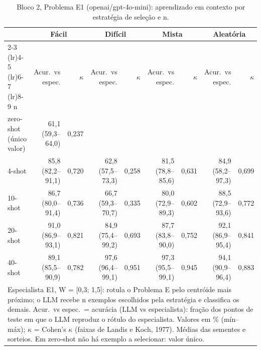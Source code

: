 \begin{table}[htbp]
\centering
\small
\caption{Bloco 2, Problema E1 (openai/gpt-4o-mini): aprendizado em contexto por estratégia de seleção e n.}
\label{tab:bloco2_E1_faseE_estrategia_x_nshot_gpt4mini}
\begin{tabular}{lrrrrrrrr}
\toprule
 & \multicolumn{2}{c}{Fácil} & \multicolumn{2}{c}{Difícil} & \multicolumn{2}{c}{Mista} & \multicolumn{2}{c}{Aleatória} \\ \cmidrule(lr){2-3} \cmidrule(lr){4-5} \cmidrule(lr){6-7} \cmidrule(lr){8-9}
n & Acur.\ vs espec. & $\kappa$ & Acur.\ vs espec. & $\kappa$ & Acur.\ vs espec. & $\kappa$ & Acur.\ vs espec. & $\kappa$ \\
\midrule
zero-shot (único valor) & 61,1 (59,3–64,0) & 0,237 &  &  &  &  &  &  \\
4-shot & 85,8 (82,2–91,1) & 0,720 & 62,8 (57,5–73,3) & 0,258 & 81,5 (78,8–85,6) & 0,631 & 84,9 (58,2–97,3) & 0,699 \\
10-shot & 86,7 (80,0–91,4) & 0,736 & 66,7 (59,3–70,7) & 0,335 & 80,0 (72,9–89,3) & 0,602 & 88,5 (72,9–93,6) & 0,772 \\
20-shot & 91,0 (86,9–93,1) & 0,821 & 84,9 (75,4–99,2) & 0,693 & 87,7 (83,8–90,0) & 0,752 & 92,1 (86,9–95,4) & 0,841 \\
40-shot & 89,1 (85,5–90,9) & 0,782 & 97,6 (96,4–99,1) & 0,951 & 97,3 (95,5–99,1) & 0,945 & 94,1 (90,9–96,4) & 0,883 \\
\bottomrule
\multicolumn{9}{p{0.95\linewidth}}{\footnotesize Especialista E1, W = [0,3; 1,5]: rotula o Problema E pelo centróide mais próximo; o LLM recebe n exemplos escolhidos pela estratégia e classifica os demais. Acur.\ vs espec.\ = acurácia (LLM vs especialista): fração dos pontos de teste em que o LLM reproduz o rótulo do especialista. Valores em \% (mín–máx); $\kappa$ = Cohen's $\kappa$ (faixas de Landis e Koch, 1977). Médias das sementes e sorteios. Em zero-shot não há exemplo a selecionar: valor único.} \\
\end{tabular}
\end{table}
